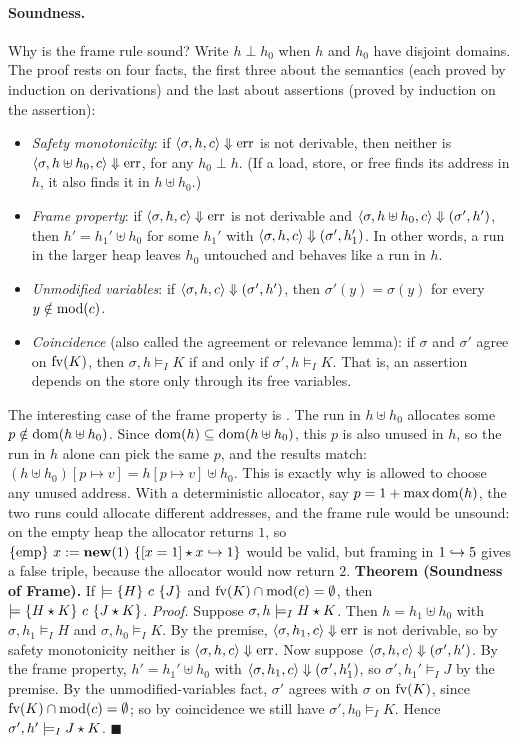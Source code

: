 \paragraph{Soundness.} Why is the frame rule sound? Write $h\perp h_0$ when $h$ and $h_0$ have
disjoint domains. The proof rests on four facts, the first three about the semantics (each proved
by induction on derivations) and the last about assertions (proved by induction on the assertion):
\begin{itemize}
  \item \emph{Safety monotonicity}: if $\langle \sigma,h,c\rangle\mathrel{\Downarrow}\mathrm{err}$ is not derivable, then neither is
    $\langle \sigma,h\uplus h_0,c\rangle\mathrel{\Downarrow}\mathrm{err}$, for any $h_0\perp h$. (If a load, store, or free finds its
    address in $h$, it also finds it in $h\uplus h_0$.)
  \item \emph{Frame property}: if $\langle \sigma,h,c\rangle\mathrel{\Downarrow}\mathrm{err}$ is not derivable and
    $\langle \sigma,h\uplus h_0,c\rangle\mathrel{\Downarrow}(\sigma',h')$, then $h'=h_1'\uplus h_0$ for some $h_1'$ with
    $\langle \sigma,h,c\rangle\mathrel{\Downarrow}(\sigma',h_1')$. In other words, a run in the larger heap leaves $h_0$
    untouched and behaves like a run in $h$.
  \item \emph{Unmodified variables}: if $\langle \sigma,h,c\rangle\mathrel{\Downarrow}(\sigma',h')$, then
    $\sigma'(y)=\sigma(y)$ for every $y\notin\mathrm{mod}(c)$.
  \item \emph{Coincidence} (also called the agreement or relevance lemma): if $\sigma$ and
    $\sigma'$ agree on $\mathrm{fv}(K)$, then $\sigma,h\models_I K$ if and only if $\sigma',h\models_I K$.
    That is, an assertion depends on the store only through its free variables.
\end{itemize}
The interesting case of the frame property is . The run in $h\uplus h_0$ allocates some
$p\notin\operatorname{dom}(h\uplus h_0)$. Since $\operatorname{dom}(h)\subseteq\operatorname{dom}(h\uplus h_0)$, this $p$ is also unused in
$h$, so the run in $h$ alone can pick the same $p$, and the results match:
$(h\uplus h_0)[p\mapsto v]=h[p\mapsto v]\uplus h_0$. This is exactly why  is allowed to
choose any unused address. With a deterministic allocator, say $p=1+\max\operatorname{dom}(h)$, the two runs
could allocate different addresses, and the frame rule would be unsound: on the empty heap the
allocator returns $1$, so $\{\mathrm{emp}\}\ x:=\mathbf{new}(1)\ \{[x=1]\mathbin{\star} x\hookrightarrow 1\}$ would be valid,
but framing in $1\hookrightarrow 5$ gives a false triple, because the allocator would now return $2$.
%
\medskip
\noindent\textbf{Theorem (Soundness of Frame).} If $\models\{H\}\ c\ \{J\}$ and
$\mathrm{fv}(K)\cap\mathrm{mod}(c)=\emptyset$, then $\models\{H\mathbin{\star} K\}\ c\ \{J\mathbin{\star} K\}$.
%
\medskip
\noindent\emph{Proof.} Suppose $\sigma,h\models_I H\mathbin{\star} K$. Then $h=h_1\uplus h_0$ with
$\sigma,h_1\models_I H$ and $\sigma,h_0\models_I K$. By the premise, $\langle \sigma,h_1,c\rangle\mathrel{\Downarrow}\mathrm{err}$ is
not derivable, so by safety monotonicity neither is $\langle \sigma,h,c\rangle\mathrel{\Downarrow}\mathrm{err}$. Now suppose
$\langle \sigma,h,c\rangle\mathrel{\Downarrow}(\sigma',h')$. By the frame property, $h'=h_1'\uplus h_0$ with
$\langle \sigma,h_1,c\rangle\mathrel{\Downarrow}(\sigma',h_1')$, so $\sigma',h_1'\models_I J$ by the premise. By the
unmodified-variables fact, $\sigma'$ agrees with $\sigma$ on $\mathrm{fv}(K)$, since
$\mathrm{fv}(K)\cap\mathrm{mod}(c)=\emptyset$; so by coincidence we still have $\sigma',h_0\models_I K$. Hence
$\sigma',h'\models_I J\mathbin{\star} K$. \hfill$\blacksquare$
%
